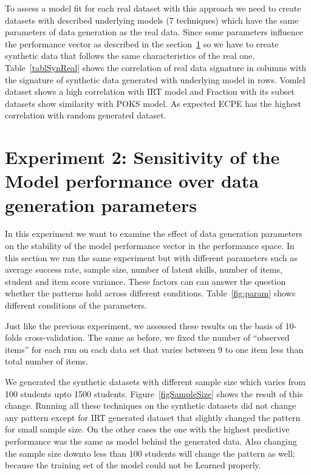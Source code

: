 To assess a model fit for each real dataset with this approach we need to create datasets with described underlying models (7 techniques) which have the same parameters of data generation as the real data. Since some parameters influence the performance vector as described in the section~\ref{Sensitive} so we have to create synthetic data that follows the same characteristics of the real one. Table~\ref{tablSynReal} shows the correlation of real data signature in columns with the signature of synthetic data generated with underlying model in rows. Vomlel dataset shows a high correlation with IRT model and Fraction with its subset datasets show similarity with POKS model. As expected ECPE has the highest correlation with random generated dataset.





\section{Experiment 2: Sensitivity of the Model performance over data generation parameters}
\label{Sensitive}

In this experiment we want to examine the effect of data generation parameters on the stability of the model performance vector in the performance space. In this section we run the same experiment but with different parameters such as average success rate, sample size, number of latent skills, number of items, student and item score variance. These factors can can answer the question whether the patterns hold across different conditions. Table~\ref{fig:param} shows different conditions of the parameters.

Just like the previous experiment, we assessed these results on the basis of 10-folds cross-validation. The same as before, we fixed the number of ``observed items'' for each run on each data set that varies between 9 to one item less than total number of items.

We generated the synthetic datasets with different sample size which varies from 100 students upto 1500 students. Figure~\ref{figSampleSize} shows the result of this change. Running all these techniques on the synthetic datasets did not change any pattern except for IRT generated dataset that slightly changed the pattern for small sample size. On the other cases the one with the highest predictive performance was the same as model behind the generated data. Also changing the sample size downto less than 100 students will change the pattern as well; because the training set of the model could not be Learned properly.

